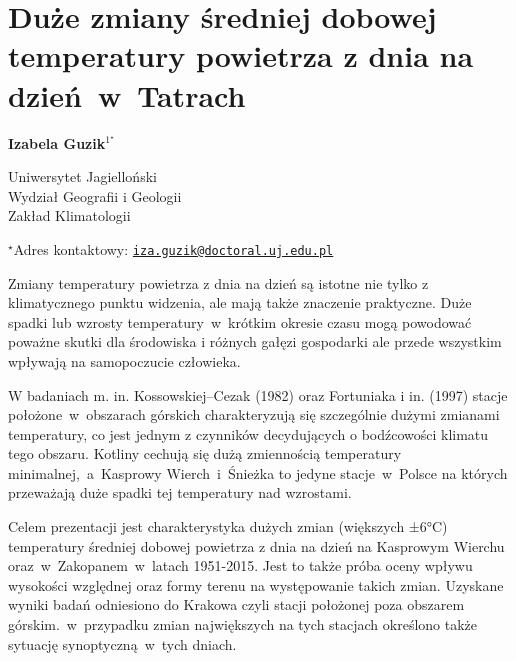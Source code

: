 \documentclass[\main/boa.tex]{subfiles}
\begin{document}
\section{Duże zmiany średniej dobowej  temperatury powietrza z dnia na dzień~w~{Tatrach}}

\begin{center}
  {\bf {} Izabela Guzik$^{1^\star}$}
\end{center}

\vskip 0.3cm

\begin{affiliations}
\begin{enumerate}
\begin{minipage}{0.915\textwidth}
\centering
\item Uniwersytet Jagielloński \\Wydział Geografii i Geologii\\ Zakład Klimatologii \\[-2pt]
\end{minipage}
\end{enumerate}
$^\star$Adres kontaktowy: \href{mailto:iza.guzik@doctoral.uj.edu.pl}{\nolinkurl{iza.guzik@doctoral.uj.edu.pl}}\\
\end{affiliations}

\vskip 0.5cm


\vskip 0.5cm

Zmiany temperatury powietrza z dnia na dzień są istotne nie tylko z klimatycznego punktu widzenia, ale mają także znaczenie praktyczne. Duże spadki lub wzrosty temperatury~w~krótkim okresie czasu mogą powodować poważne skutki dla środowiska i różnych gałęzi gospodarki ale przede wszystkim wpływają na samopoczucie człowieka.

W badaniach m. in. Kossowskiej--Cezak (1982) oraz Fortuniaka i in. (1997) stacje położone~w~obszarach górskich charakteryzują się szczególnie dużymi zmianami temperatury, co jest jednym z czynników decydujących o bodźcowości klimatu tego obszaru. Kotliny cechują się dużą zmiennością temperatury minimalnej,~a~Kasprowy Wierch~i~Śnieżka to jedyne stacje~w~Polsce na których przeważają duże spadki tej temperatury nad wzrostami.

Celem prezentacji jest charakterystyka dużych zmian (większych ±6°C) temperatury średniej dobowej powietrza z dnia na dzień na Kasprowym Wierchu oraz~w~Zakopanem~w~latach 1951-2015. Jest to także próba oceny wpływu wysokości względnej oraz formy terenu na występowanie takich zmian. Uzyskane wyniki badań odniesiono do Krakowa czyli stacji położonej poza obszarem górskim.~w~przypadku zmian największych na tych stacjach określono także sytuację synoptyczną~w~tych dniach.
\end{document}
